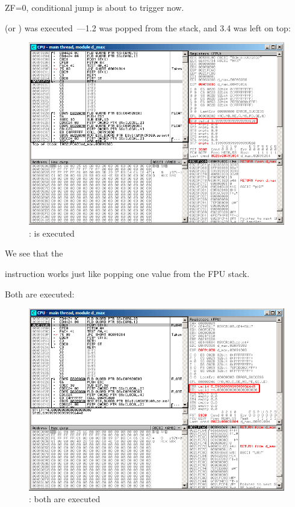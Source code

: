 ZF=0, conditional jump is about to trigger now.

\clearpage
{} (or \FSTP {}) was executed~---1.2 was popped from the stack, and 3.4 was left on top:

\begin{figure}[H]
\centering
\includegraphics[scale=\FigScale]{patterns/12_FPU/3_comparison/x86/MSVC_Ox/olly1_5.png}
\caption{\olly: \FSTP is executed}
\label{fig:FPU_comparison_Ox_case1_olly5}
\end{figure}

We see that the  

instruction works just like popping one value from the FPU stack.

\clearpage
{}

Both \FLD are executed:

\begin{figure}[H]
\centering
\includegraphics[scale=\FigScale]{patterns/12_FPU/3_comparison/x86/MSVC_Ox/olly2_1.png}
\caption{\olly: both \FLD are executed}
\label{fig:FPU_comparison_Ox_case2_olly1}
\end{figure}

